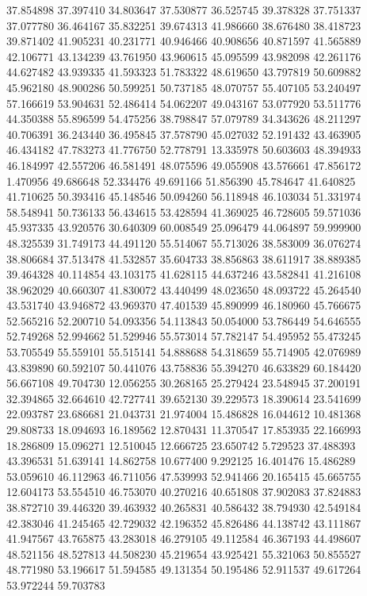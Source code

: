 37.854898
37.397410
34.803647
37.530877
36.525745
39.378328
37.751337
37.077780
36.464167
35.832251
39.674313
41.986660
38.676480
38.418723
39.871402
41.905231
40.231771
40.946466
40.908656
40.871597
41.565889
42.106771
43.134239
43.761950
43.960615
45.095599
43.982098
42.261176
44.627482
43.939335
41.593323
51.783322
48.619650
43.797819
50.609882
45.962180
48.900286
50.599251
50.737185
48.070757
55.407105
53.240497
57.166619
53.904631
52.486414
54.062207
49.043167
53.077920
53.511776
44.350388
55.896599
54.475256
38.798847
57.079789
34.343626
48.211297
40.706391
36.243440
36.495845
37.578790
45.027032
52.191432
43.463905
46.434182
47.783273
41.776750
52.778791
13.335978
50.603603
48.394933
46.184997
42.557206
46.581491
48.075596
49.055908
43.576661
47.856172
1.470956
49.686648
52.334476
49.691166
51.856390
45.784647
41.640825
41.710625
50.393416
45.148546
50.094260
56.118948
46.103034
51.331974
58.548941
50.736133
56.434615
53.428594
41.369025
46.728605
59.571036
45.937335
43.920576
30.640309
60.008549
25.096479
44.064897
59.999900
48.325539
31.749173
44.491120
55.514067
55.713026
38.583009
36.076274
38.806684
37.513478
41.532857
35.604733
38.856863
38.611917
38.889385
39.464328
40.114854
43.103175
41.628115
44.637246
43.582841
41.216108
38.962029
40.660307
41.830072
43.440499
48.023650
48.093722
45.264540
43.531740
43.946872
43.969370
47.401539
45.890999
46.180960
45.766675
52.565216
52.200710
54.093356
54.113843
50.054000
53.786449
54.646555
52.749268
52.994662
51.529946
55.573014
57.782147
54.495952
55.473245
53.705549
55.559101
55.515141
54.888688
54.318659
55.714905
42.076989
43.839890
60.592107
50.441076
43.758836
55.394270
46.633829
60.184420
56.667108
49.704730
12.056255
30.268165
25.279424
23.548945
37.200191
32.394865
32.664610
42.727741
39.652130
39.229573
18.390614
23.541699
22.093787
23.686681
21.043731
21.974004
15.486828
16.044612
10.481368
29.808733
18.094693
16.189562
12.870431
11.370547
17.853935
22.166993
18.286809
15.096271
12.510045
12.666725
23.650742
5.729523
37.488393
43.396531
51.639141
14.862758
10.677400
9.292125
16.401476
15.486289
53.059610
46.112963
46.711056
47.539993
52.941466
20.165415
45.665755
12.604173
53.554510
46.753070
40.270216
40.651808
37.902083
37.824883
38.872710
39.446320
39.463932
40.265831
40.586432
38.794930
42.549184
42.383046
41.245465
42.729032
42.196352
45.826486
44.138742
43.111867
41.947567
43.765875
43.283018
46.279105
49.112584
46.367193
44.498607
48.521156
48.527813
44.508230
45.219654
43.925421
55.321063
50.855527
48.771980
53.196617
51.594585
49.131354
50.195486
52.911537
49.617264
53.972244
59.703783

